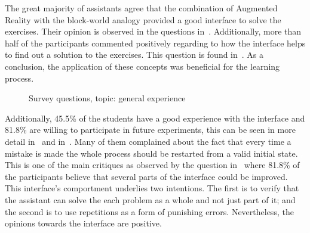 The great majority of assistants agree that the combination of
Augmented Reality with the block\hyp{}world analogy provided a good
interface to solve the exercises. Their opinion is observed in the
questions in~. Additionally,
more than half of the participants commented positively regarding to
how the interface helps to find out a solution to the exercises. This
question is found in~. As a conclusion, the
application of these concepts was beneficial for the learning process.

\begin{figure}
  \centering
  \caption{Survey questions, topic: general experience}
\end{figure}

Additionally, 45.5\% of the students have a good experience with the
interface and 81.8\% are willing to participate in future experiments,
this can be seen in more detail in~ and
in~. Many of them complained about the fact that
every time a mistake is made the whole process should be restarted
from a valid initial state. This is one of the main critiques as
observed by the question in~ where 81.8\% of the
participants believe that several parts of the interface could be
improved. This interface's comportment underlies two intentions. The
first is to verify that the assistant can solve the each problem as a
whole and not just part of it; and the second is to use repetitions as
a form of punishing errors. Nevertheless, the opinions towards the
interface are positive.

